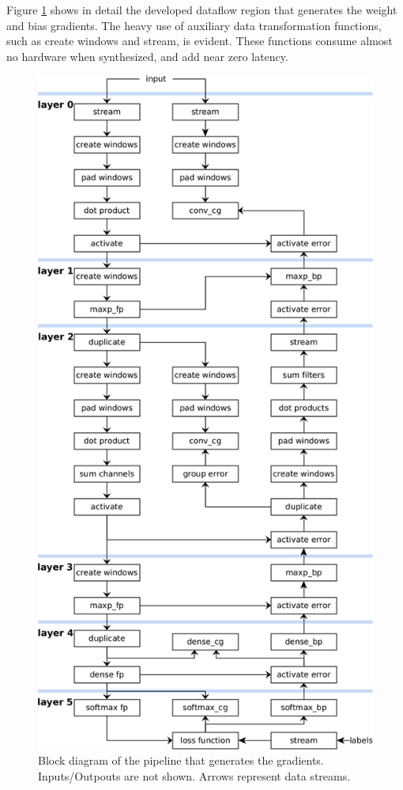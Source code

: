 Figure \ref{fig: Gradients Calculation Pipeline Block Diagram} shows in detail the developed dataflow region that generates the weight and bias gradients. The heavy use of auxiliary data transformation functions, such as create windows and stream, is evident. These functions consume almost no hardware when synthesized, and add near zero latency. %
\begin{figure}[H]
    \centering
        \includegraphics[height=0.95\textheight]{Images/block_diagrams/process_batch.png}
        \decoRule
        \caption[Gradients Calculation Pipeline Block Diagram]{Block diagram of the pipeline that generates the gradients. Inputs/Outpouts are not shown. Arrows represent data streams.}
        \label{fig: Gradients Calculation Pipeline Block Diagram}
\end{figure}

